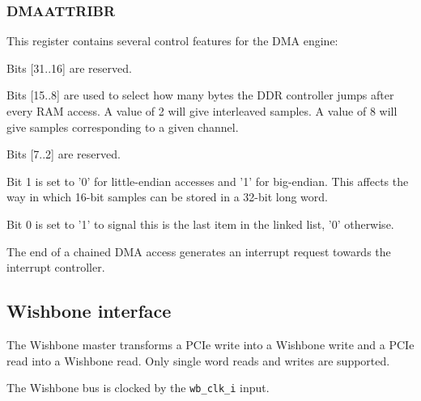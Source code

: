 \documentclass[10pt,a4paper]{cerndoc}
\begin{document}
\subsubsection{DMAATTRIBR}
This register contains several control features for the DMA engine:
\begin{packed_item}
\item Bits [31..16] are reserved.
\item Bits [15..8] are used to select how many bytes the DDR controller jumps after every RAM access. A value of 2 will give interleaved samples. A value of 8 will give samples corresponding to a given channel.
\item Bits [7..2] are reserved.
\item Bit 1 is set to '0' for little-endian accesses and '1' for big-endian. This affects the way in which 16-bit samples can be stored in a 32-bit long word.
\item Bit 0 is set to '1' to signal this is the last item in the linked list, '0' otherwise.
\end{packed_item}

The end of a chained DMA access generates an interrupt request towards the interrupt controller.    
    \subsection{Wishbone interface}
    The Wishbone master transforms a PCIe write into a Wishbone write and a PCIe read into a Wishbone read. Only single word reads and writes are supported.
    
    The Wishbone bus is clocked by the \verb+wb_clk_i+ input.
    
\end{document}
